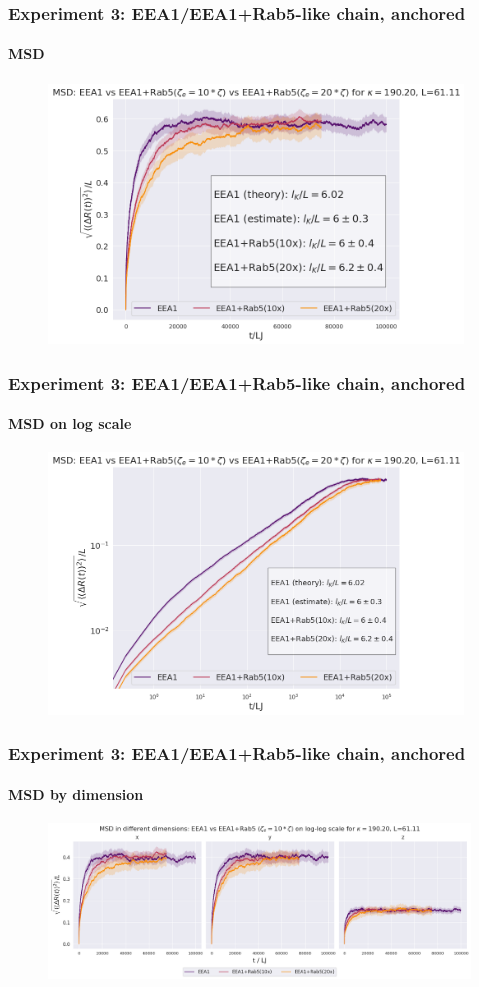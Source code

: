 \documentclass[handout]{beamer}
\begin{document}
\begin{frame}
    \frametitle{Experiment 3: EEA1/EEA1+Rab5-like chain, anchored}
    \framesubtitle{MSD}
    \framesubtitle{}
    \begin{figure}[h]
        \includegraphics[width=11cm]{./14+15+16-exp-msd.png}
    \end{figure}
\end{frame}

\begin{frame}
    \frametitle{Experiment 3: EEA1/EEA1+Rab5-like chain, anchored}
    \framesubtitle{MSD on log scale}
    \begin{figure}[h]
        \includegraphics[width=11cm]{./14+15+16-exp-msd-log.png}
    \end{figure}
\end{frame}

\begin{frame}
    \frametitle{Experiment 3: EEA1/EEA1+Rab5-like chain, anchored}
    \framesubtitle{MSD by dimension}
    \begin{figure}[h]
        \includegraphics[width=11.2cm]{./14+15+16-exp-msd-dim.png}
    \end{figure}
\end{frame}
\end{document}

